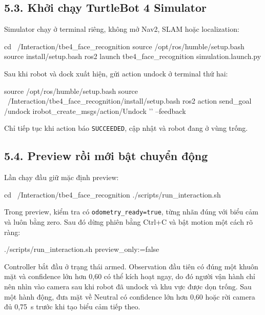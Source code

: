 \subsection*{5.3. Khởi chạy TurtleBot 4 Simulator}

Simulator chạy ở terminal riêng, không mở Nav2, SLAM hoặc localization:

\begin{svcode}
cd ~/Interaction/tbe4_face_recognition
source /opt/ros/humble/setup.bash
source install/setup.bash
ros2 launch tbe4_face_recognition simulation.launch.py
\end{svcode}

Sau khi robot và dock xuất hiện, gửi action undock ở terminal thứ hai:

\begin{svcode}
source /opt/ros/humble/setup.bash
source ~/Interaction/tbe4_face_recognition/install/setup.bash
ros2 action send_goal /undock irobot_create_msgs/action/Undock '{}' --feedback
\end{svcode}

Chỉ tiếp tục khi action báo \texttt{SUCCEEDED},  cập nhật và robot
đang ở vùng trống.

\subsection*{5.4. Preview rồi mới bật chuyển động}

Lần chạy đầu giữ mặc định preview:

\begin{svcode}
cd ~/Interaction/tbe4_face_recognition
./scripts/run_interaction.sh
\end{svcode}

Trong preview, kiểm tra  có
\texttt{odometry\_ready=true}, từng nhãn đúng với biểu cảm và
 luôn bằng zero. Sau đó dừng phiên bằng Ctrl+C và bật motion một
cách rõ ràng:

\begin{svcode}
./scripts/run_interaction.sh preview_only:=false
\end{svcode}

Controller bắt đầu ở trạng thái armed. Observation đầu tiên có đúng một khuôn
mặt và confidence lớn hơn 0,60 có thể kích hoạt ngay, do đó người vận hành chỉ
nên nhìn vào camera sau khi robot đã undock và khu vực được dọn trống. Sau một
hành động, đưa mặt về Neutral có confidence lớn hơn 0,60 hoặc rời camera đủ
0,75~s trước khi tạo biểu cảm tiếp theo.

